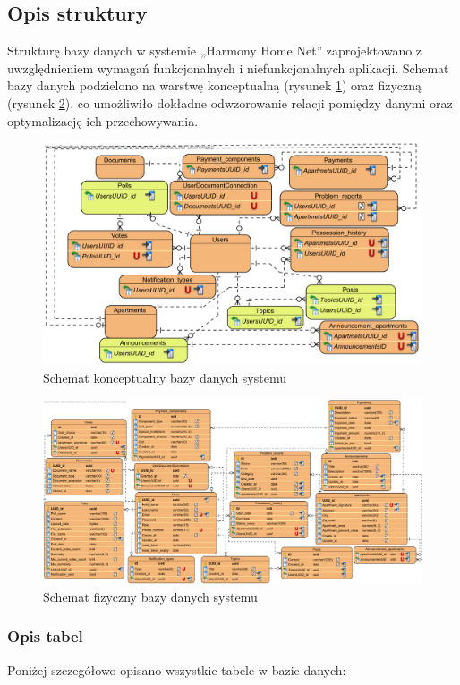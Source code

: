 \subsection{Opis struktury}

Strukturę bazy danych w systemie „Harmony Home Net” zaprojektowano z uwzględnieniem wymagań funkcjonalnych i niefunkcjonalnych aplikacji. Schemat bazy danych podzielono na warstwę konceptualną (rysunek \ref{fig:ebok_db_concept}) oraz fizyczną (rysunek \ref{fig:ebok_db_physical}), co umożliwiło dokładne odwzorowanie relacji pomiędzy danymi oraz optymalizację ich przechowywania.
\begin{figure}[ht]
    \centering
    \includegraphics[width=.9\linewidth]{rys03/ebok_db_concept}
    \caption{Schemat konceptualny bazy danych systemu}
    \label{fig:ebok_db_concept}
\end{figure}
\begin{figure}[ht]
    \centering
    \includegraphics[width=1\linewidth]{rys03/ebok_db_physical}
		\caption{Schemat fizyczny bazy danych systemu}
    \label{fig:ebok_db_physical}
\end{figure}

\subsubsection{Opis tabel}
Poniżej szczegółowo opisano wszystkie tabele w bazie danych:

